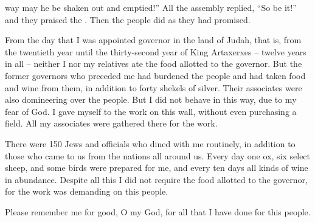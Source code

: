 {way may he be
shaken out
and emptied!” All
the assembly
replied,
“So be it!” and they praised
the
{}. Then the people
did
as they had promised.
\par }{\PP {}From
the day
that
I
was
appointed
governor
in the land
of Judah,
that is, from the twentieth
year
until
the thirty-second
year
of King
Artaxerxes
– twelve
years in all – neither I nor my relatives ate the food allotted to the governor.
But the former
governors
who
preceded
me had burdened
the people
and had taken
food
and wine
from them, in addition
to forty
shekels
of silver.
Their associates
were also
domineering
over
the people.
But I
did not
behave
in this way,
due to
my fear
of God.
I gave myself
to the work
on this
wall,
without even
purchasing
a field.
All
my associates
were gathered
there
for the work.
\par }{\PP {}There were 150
Jews
and officials
who dined
with me routinely,
in addition to those
who came
to us
from
the nations
all around us.
Every day
one
ox,
six
select
sheep,
and some birds
were prepared
for me, and every
ten
days
all
kinds of wine
in abundance.
Despite
all this
I did not
require
the food
allotted to the governor,
for
the work
was demanding
on
this
people.
\par }{\PP {}Please remember
me for good,
O my God,
for all
that
I have done
for this
people.

}
